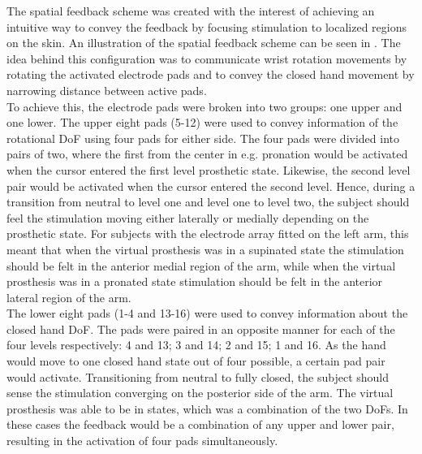 The spatial feedback scheme was created with the interest of achieving an intuitive way to convey the feedback by focusing stimulation to localized regions on the skin. An illustration of the spatial feedback scheme can be seen in . The idea behind this configuration was to communicate wrist rotation movements by rotating the activated electrode pads and to convey the closed hand movement by narrowing distance between active pads. \\
To achieve this, the electrode pads were broken into two groups: one upper and one lower. The upper eight pads (5-12) were used to convey information of the rotational DoF using four pads for either side.  The four pads were divided into pairs of two, where the first from the center in e.g. pronation would be activated when the cursor entered the first level prosthetic state. Likewise, the second level pair would be activated when the cursor entered the second level. Hence, during a transition from neutral to level one and level one to level two, the subject should feel the stimulation moving either laterally or medially depending on the prosthetic state. For subjects with the electrode array fitted on the left arm, this meant that when the virtual prosthesis was in a supinated state the stimulation should be felt in the anterior medial region of the arm, while when the virtual prosthesis was in a pronated state stimulation should be felt in the anterior lateral region of the arm.   \\
The lower eight pads (1-4 and 13-16) were used to convey information about the closed hand DoF. The pads were paired in an opposite manner for each of the four levels respectively: 4 and 13; 3 and 14; 2 and 15; 1 and 16. As the hand would move to one closed hand state out of four possible, a certain pad pair would activate. Transitioning from neutral to fully closed, the subject should sense the stimulation converging on the posterior side of the arm. The virtual prosthesis was able to be in states, which was a combination of the two DoFs. In these cases the feedback would be a combination of any upper and lower pair, resulting in the activation of four pads simultaneously. %

